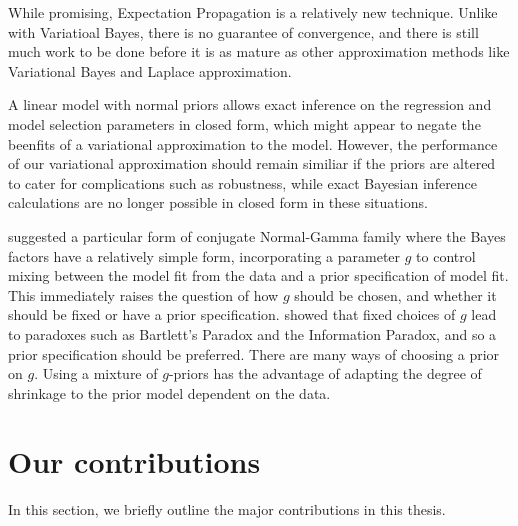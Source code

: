While promising, Expectation Propagation is a relatively new technique.
Unlike with Variatioal Bayes, there is no guarantee of convergence, and there is still much work to be done
before it is as mature as other approximation methods like Variational Bayes and Laplace approximation.

A linear model with normal priors allows exact inference on the regression and model selection parameters in
closed form, which might appear to negate the beenfits of a variational approximation to the model. However,
the performance of our variational approximation should remain similiar if the priors are altered to cater for
complications such as robustness, while exact Bayesian inference calculations are no longer possible in closed
form in these situations.

\cite{Zellner1986} suggested a particular form of conjugate Normal-Gamma family where the Bayes factors have a
relatively simple form, incorporating a parameter $g$ to control mixing between the model fit from the data
and a prior specification of model fit. This immediately raises the question of how $g$ should be chosen, and
whether it should be fixed or have a prior specification. \cite{Liang2008} showed that fixed choices of $g$
lead to paradoxes such as Bartlett's Paradox and the Information Paradox, and so a prior specification should
be preferred. There are many ways of choosing a prior on $g$. Using a mixture of $g$-priors has the advantage
of adapting the degree of shrinkage to the prior model dependent on the data.

\section{Our contributions}

In this section, we briefly outline the major contributions in this thesis.

